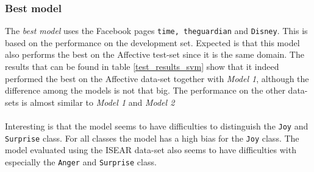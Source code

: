 \documentclass[
10pt, %
a4paper, %
oneside, %
headinclude,footinclude, %
BCOR5mm, %
]{scrartcl}
\begin{document}
\subsubsection{Best model}
The \textit{best model} uses the Facebook pages \texttt{time, theguardian} and \texttt{Disney}. This is based on the performance on the development set. Expected is that this model also performs the best on the Affective test-set since it is the same domain. The results that can be found in table \ref{test_results_svm} show that it indeed performed the best on the Affective data-set together with \textit{Model 1}, although the difference among the models is not that big. The performance on the other data-sets is almost similar to  \textit{Model 1} and \textit{Model 2}\\\\
Interesting is that the model seems to have difficulties to distinguish the \texttt{Joy} and \texttt{Surprise} class. For all classes the model has a high bias for the \texttt{Joy} class. The model evaluated using the ISEAR data-set also seems to have difficulties with especially the \texttt{Anger} and \texttt{Surprise} class.
\end{document}
